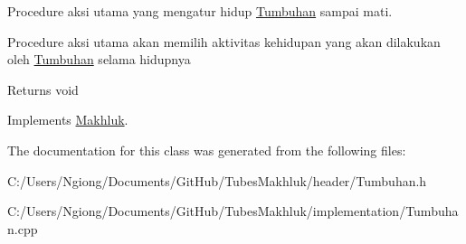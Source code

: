 Procedure aksi utama yang mengatur hidup \hyperlink{class_tumbuhan}{Tumbuhan} sampai mati. 

Procedure aksi utama akan memilih aktivitas kehidupan yang akan dilakukan oleh \hyperlink{class_tumbuhan}{Tumbuhan} selama hidupnya \begin{DoxyReturn}{Returns}
void 
\end{DoxyReturn}


Implements \hyperlink{class_makhluk}{Makhluk}.



The documentation for this class was generated from the following files\+:\begin{DoxyCompactItemize}
\item 
C\+:/\+Users/\+Ngiong/\+Documents/\+Git\+Hub/\+Tubes\+Makhluk/header/Tumbuhan.\+h\item 
C\+:/\+Users/\+Ngiong/\+Documents/\+Git\+Hub/\+Tubes\+Makhluk/implementation/Tumbuhan.\+cpp\end{DoxyCompactItemize}
